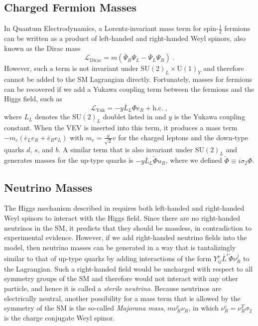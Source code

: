 \subsection{Charged Fermion Masses}
\label{sec:charged-fermion-masses}
In Quantum Electrodynamics, a Lorentz-invariant mass term for spin-$\frac{1}{2}$ fermions can be written as a product of left-handed and right-handed Weyl spinors, also known as the Dirac mass
\begin{equation}
    \mathcal{L}_\mathrm{Dirac} = m (\bar{\Psi}_R \Psi_L - \bar{\Psi}_L \Psi_R)\;.
\end{equation}
However, such a term is not invariant under $\mathrm{SU}(2)_L \times \mathrm{U}(1)_Y$ and therefore cannot be added to the SM Lagrangian directly.
Fortunately, masses for fermions can be recovered if we add a Yukawa coupling term between the fermions and the Higgs field, such as
\begin{equation}
    \mathcal{L}_\mathrm{Yuk} = -y \bar{L}_L \Phi e_R + \mathrm{h.c.}\;,
\end{equation}
where $L_L$ denotes the $\mathrm{SU}(2)_L$ doublet listed in  and $y$ is the Yukawa coupling constant. When the VEV is inserted into this term, it produces a mass term $-m_e (\bar{e}_L e_R + \bar{e}_R e_L)$ with $m_e = \frac{y}{\sqrt{2}}v$ for the charged leptons and the down-type quarks $d$, $s$, and $b$.
 A similar term that is also invariant under $\mathrm{SU}(2)_L$ and generates masses for the up-type quarks is $-y \bar{L}_L \tilde{\Phi} u_R$, where we defined $\tilde{\Phi} \equiv i \sigma_2 \Phi$.

\subsection{Neutrino Masses}
The Higgs mechanism described in  requires both left-handed and right-handed Weyl spinors to interact with the Higgs field.
Since there are no right-handed neutrinos in the SM, it predicts that they should be massless, in contradiction to experimental evidence.
However, if we add right-handed neutrino fields into the model, then neutrino masses can be generated in a way that is tantalizingly similar to that of up-type quarks by adding interactions of the form $Y_{ij}^\nu \bar{L}^i \tilde{\Phi}\nu_R^j$ to the Lagrangian.
Such a right-handed field would be uncharged with respect to all symmetry groups of the SM and therefore would not interact with any other particle, and hence it is called a \emph{sterile neutrino}.
Because neutrinos are electrically neutral, another possibility for a mass term that is allowed by the symmetry of the SM is the so-called \emph{Majorana mass}, $m \nu_R^c \nu_R$, in which $\nu_R^c=\nu_R^T \sigma_2$ is the charge conjugate Weyl spinor.

